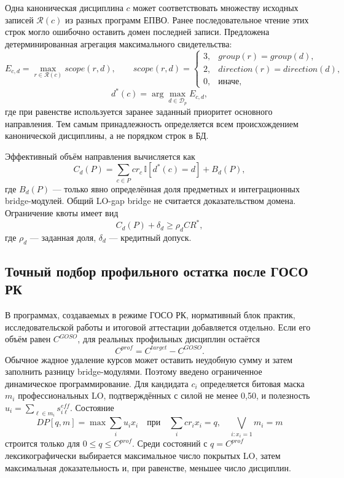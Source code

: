 \documentclass[twoside,11pt]{article}
\begin{document}
Одна каноническая дисциплина $c$ может соответствовать множеству исходных
записей $\mathcal{R}(c)$ из разных программ ЕПВО. Ранее последовательное чтение
этих строк могло ошибочно оставить домен последней записи. Предложена
детерминированная агрегация максимального свидетельства:
\begin{equation}
E_{c,d}=\max_{r\in\mathcal{R}(c)} scope(r,d),\qquad
scope(r,d)=
\begin{cases}
3,& group(r)=group(d),\\
2,& direction(r)=direction(d),\\
0,& \text{иначе},
\end{cases}
\label{eq:domain-evidence}
\end{equation}
\begin{equation}
d^{\ast}(c)=\arg\max_{d\in\mathcal{D}_p}E_{c,d},
\label{eq:domain-assignment}
\end{equation}
где при равенстве используется заранее заданный приоритет основного
направления. Тем самым принадлежность определяется всем происхождением
канонической дисциплины, а не порядком строк в БД.

Эффективный объём направления вычисляется как
\begin{equation}
C_d(P)=\sum_{c\in P}cr_c\,\mathbb{I}[d^{\ast}(c)=d]+B_d(P),
\label{eq:effective-domain-credits}
\end{equation}
где $B_d(P)$ --- только явно определённая доля предметных и интеграционных
bridge-модулей. Общий LO-gap bridge не считается доказательством домена.
Ограничение квоты имеет вид
\begin{equation}
C_d(P)+\delta_d\geq \rho_d CR^{\ast},
\label{eq:domain-quota-tolerance}
\end{equation}
где $\rho_d$ --- заданная доля, $\delta_d$ --- кредитный допуск.

\subsection{Точный подбор профильного остатка после ГОСО РК}

В программах, создаваемых в режиме ГОСО РК, нормативный блок практик,
исследовательской работы и итоговой аттестации добавляется отдельно. Если его
объём равен $C^{GOSO}$, для реальных профильных дисциплин остаётся
\begin{equation}
  C^{prof}=C^{target}-C^{GOSO}.
  \label{eq:professional-residual}
\end{equation}
Обычное жадное удаление курсов может оставить неудобную сумму и затем заполнить
разницу bridge-модулями. Поэтому введено ограниченное динамическое
программирование. Для кандидата $c_i$ определяется битовая маска $m_i$
профессиональных LO, подтверждённых с силой не менее 0,50, и полезность
$u_i=\sum_{\ell\in m_i}s_{i\ell}^{eff}$. Состояние
\begin{equation}
  DP[q,m]=\max \sum_i u_i x_i
  \quad\text{при}\quad
  \sum_i cr_i x_i=q,
  \quad \bigvee_{i:x_i=1}m_i=m
  \label{eq:goso-knapsack}
\end{equation}
строится только для $0\le q\le C^{prof}$. Среди состояний с
$q=C^{prof}$ лексикографически выбирается максимальное число покрытых LO, затем
максимальная доказательность и, при равенстве, меньшее число дисциплин.
\end{document}
